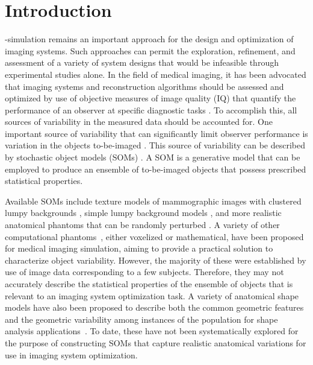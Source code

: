 \documentclass[journal]{IEEEtran}
\begin{document}
\section{Introduction}
\label{sec:introduction}
-simulation remains an important approach for the design and optimization
of imaging systems. Such approaches can permit the exploration, refinement, and assessment
 of a variety of system designs that would be infeasible through experimental studies alone.
In the field of medical imaging, it has been advocated that imaging systems
 and reconstruction algorithms
 should be assessed and optimized
by use of objective measures of image quality (IQ) that quantify the performance of an observer at specific diagnostic tasks \cite{myers1993rayleigh,wagner1985unified,barrett1993model,barrett2013foundations,anastasio2010analysis}.
To accomplish this,  all sources of variability in the measured data should  be
accounted for.
One important source of variability that can significantly limit observer performance
is variation in the objects to-be-imaged \cite{rolland1992effect}.
This source of variability can be described by stochastic object models (SOMs)
 \cite{kupinski2003experimental}.
A SOM is a  generative model that can be employed to produce an ensemble of to-be-imaged objects 
that possess prescribed statistical properties.


Available SOMs include  texture models of mammographic images with
clustered lumpy backgrounds \cite{bochud1999statistical}, simple lumpy background models
\cite{rolland1992effect}, and more realistic 
anatomical phantoms that can be randomly perturbed \cite{segars2008realistic}.
A variety of other computational phantoms~\cite{segars2002study,xu2014exponential,zankl2010gsf,collins1998design,caon2004voxel, zu2005vip, segars2008realistic,li2009methodology},
either voxelized or mathematical, have been proposed for medical imaging simulation,
 aiming to provide a practical solution to characterize object variability.
However, the majority of these were established by use of image data corresponding to a few subjects.
Therefore, they may not accurately describe the statistical properties
of the  ensemble of objects that is relevant to an imaging system optimization task. 
 A variety of anatomical shape models have also been proposed to describe both the common geometric features
and the geometric variability among instances of the population for shape
 analysis applications~\cite{cootes1995active,cootes2015active,heimann2009statistical,ferrari2010images,shen2012detecting,gordillo2013state,
tomoshige2014conditional,ambellan2019automated}.
To date, these have not been systematically explored for the purpose of
 constructing SOMs that capture realistic anatomical variations
for use in imaging system optimization.
\end{document}
